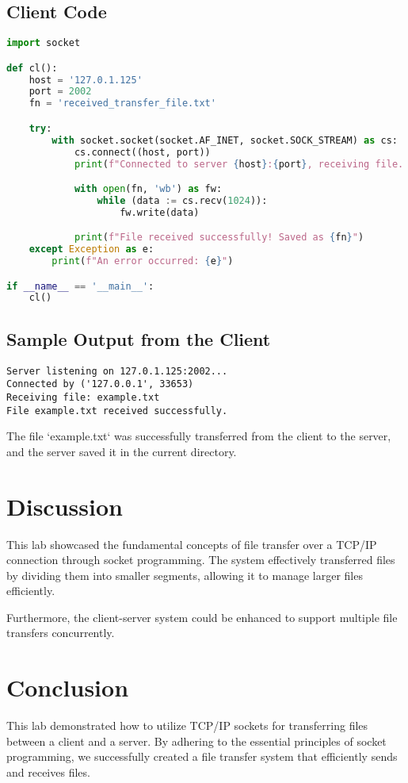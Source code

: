 \documentclass[a4paper,12pt]{article}
\begin{document}
\subsection{Client Code}

\begin{lstlisting}[language=Python, caption=Client Code]
import socket

def cl():
    host = '127.0.1.125'
    port = 2002
    fn = 'received_transfer_file.txt'

    try:
        with socket.socket(socket.AF_INET, socket.SOCK_STREAM) as cs:
            cs.connect((host, port))
            print(f"Connected to server {host}:{port}, receiving file...")

            with open(fn, 'wb') as fw:
                while (data := cs.recv(1024)):
                    fw.write(data)

            print(f"File received successfully! Saved as {fn}")
    except Exception as e:
        print(f"An error occurred: {e}")

if __name__ == '__main__':
    cl()
\end{lstlisting}

\subsection{Sample Output from the Client}

\begin{verbatim}
Server listening on 127.0.1.125:2002...
Connected by ('127.0.0.1', 33653)
Receiving file: example.txt
File example.txt received successfully.
\end{verbatim}

The file `example.txt` was successfully transferred from the client to the server, and the server saved it in the current directory.

\section{Discussion}
This lab showcased the fundamental concepts of file transfer over a TCP/IP connection through socket programming. The system effectively transferred files by dividing them into smaller segments, allowing it to manage larger files efficiently.

Furthermore, the client-server system could be enhanced to support multiple file transfers concurrently.

\section{Conclusion}
This lab demonstrated how to utilize TCP/IP sockets for transferring files between a client and a server. By adhering to the essential principles of socket programming, we successfully created a file transfer system that efficiently sends and receives files. 
\end{document}
